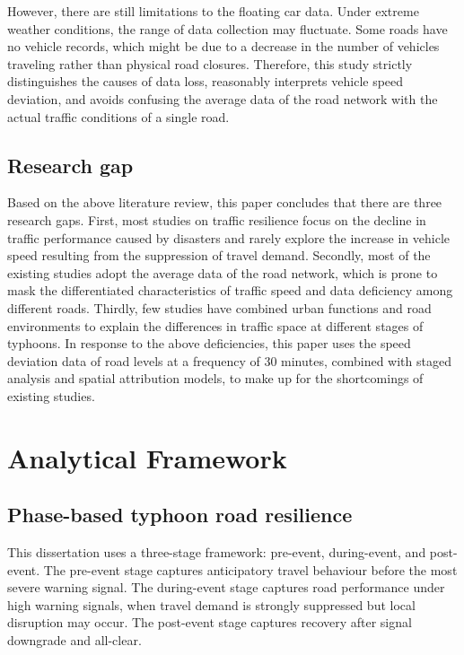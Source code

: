 \documentclass[12pt,a4paper]{report}
\begin{document}
However, there are still limitations to the floating car data. Under extreme weather conditions, the range of data collection may fluctuate. Some roads have no vehicle records, which might be due to a decrease in the number of vehicles traveling rather than physical road closures. Therefore, this study strictly distinguishes the causes of data loss, reasonably interprets vehicle speed deviation, and avoids confusing the average data of the road network with the actual traffic conditions of a single road.

\section{Research gap}
Based on the above literature review, this paper concludes that there are three research gaps. First, most studies on traffic resilience focus on the decline in traffic performance caused by disasters and rarely explore the increase in vehicle speed resulting from the suppression of travel demand. Secondly, most of the existing studies adopt the average data of the road network, which is prone to mask the differentiated characteristics of traffic speed and data deficiency among different roads. Thirdly, few studies have combined urban functions and road environments to explain the differences in traffic space at different stages of typhoons. In response to the above deficiencies, this paper uses the speed deviation data of road levels at a frequency of 30 minutes, combined with staged analysis and spatial attribution models, to make up for the shortcomings of existing studies.

\chapter{Analytical Framework}

\section{Phase-based typhoon road resilience}
This dissertation uses a three-stage framework: pre-event, during-event, and post-event. The pre-event stage captures anticipatory travel behaviour before the most severe warning signal. The during-event stage captures road performance under high warning signals, when travel demand is strongly suppressed but local disruption may occur. The post-event stage captures recovery after signal downgrade and all-clear.
\end{document}
